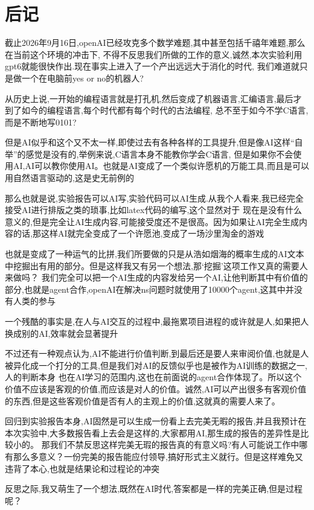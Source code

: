 \section{后记}
截止2026年9月16日,openAI已经攻克多个数学难题,其中甚至包括千禧年难题,那么在当前这个环境的冲击下,
不得不反思我们所做的工作的意义,诚然,本次实验利用gpt6就能很快作出.现在事实上进入了一个产出远远大于消化的时代,
我们难道就只是做一个在电脑前yes or no的机器人?

从历史上说,一开始的编程语言就是打孔机,然后变成了机器语言,汇编语言,最后才到了如今的编程语言,每个时代都有每个时代的古法编程,
总不至于如今不学C语言,而是不断地写0101?

但是AI似乎和这个又不太一样,即使过去有各种各样的工具提升,但是像AI这样“自举”的感觉是没有的,举例来说,C语言本身不能教你学会C语言,
但是如果你不会使用AI,AI可以教你使用AI。也就是AI变成了一个类似许愿机的万能工具,而且是可以用自然语言驱动的,这是史无前例的

那么也就是说,实验报告可以AI写,实验代码可以AI生成.从我个人看来,我已经完全接受AI进行排版之类的琐事,比如latex代码的编写,这个显然对于
现在是没有什么意义的,但是完全让AI生成内容,可能接受度还不是很高。因为如果让AI完全生成内容的话,那这样AI就完全变成了一个许愿池,变成了一场沙里淘金的游戏

也就是变成了一种运气的比拼,我们所要做的只是从浩如烟海的概率生成的AI文本中挖掘出有用的部分。但是这样我又有另一个想法,那‘挖掘’这项工作又真的需要人来做吗？
我们完全可以把一个AI生成的内容发给另一个AI,让他判断其中有价值的部分,也就是agent合作,openAI在解决ns问题时就使用了10000个agent,这其中并没有人类的参与

一个残酷的事实是,在人与AI交互的过程中,最拖累项目进程的或许就是人,如果把人换成别的AI,效率就会显著提升

不过还有一种观点认为,AI不能进行价值判断,到最后还是要人来审阅价值,也就是人被异化成一个打分的工具,但是我们对AI的反馈似乎也是被作为AI训练的数据之一,人的判断本身
也在AI学习的范围内,这也在前面说的agent合作体现了。所以这个价值不应该是客观的价值,而应该是对人的价值。诚然,AI可以产出很多有客观价值的东西,但是这些客观价值是否有人的主观上的价值,这就真的需要人来了。

回归到实验报告本身,AI固然是可以生成一份看上去完美无暇的报告,并且我预计在本次实验中,大多数报告看上去会是这样的,大家都用AI,那生成的报告的差异性是比较小的。
那我们不禁反思这样完美无瑕的报告真的有意义吗?有人可能说工作中哪有那么多意义？一份完美的报告能应付领导,搞好形式主义就行。但是这样难免又违背了本心,也就是结果论和过程论的冲突

反思之际,我又萌生了一个想法,既然在AI时代,答案都是一样的完美正确,但是过程呢？

